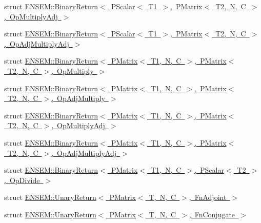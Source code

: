 \begin{DoxyCompactItemize}
\item 
struct \mbox{\hyperlink{structENSEM_1_1BinaryReturn_3_01PScalar_3_01T1_01_4_00_01PMatrix_3_01T2_00_01N_00_01C_01_4_00_01OpMultiplyAdj_01_4}{E\+N\+S\+E\+M\+::\+Binary\+Return$<$ P\+Scalar$<$ T1 $>$, P\+Matrix$<$ T2, N, C $>$, Op\+Multiply\+Adj $>$}}
\item 
struct \mbox{\hyperlink{structENSEM_1_1BinaryReturn_3_01PScalar_3_01T1_01_4_00_01PMatrix_3_01T2_00_01N_00_01C_01_4_00_01OpAdjMultiplyAdj_01_4}{E\+N\+S\+E\+M\+::\+Binary\+Return$<$ P\+Scalar$<$ T1 $>$, P\+Matrix$<$ T2, N, C $>$, Op\+Adj\+Multiply\+Adj $>$}}
\item 
struct \mbox{\hyperlink{structENSEM_1_1BinaryReturn_3_01PMatrix_3_01T1_00_01N_00_01C_01_4_00_01PMatrix_3_01T2_00_01N_00_01C_01_4_00_01OpMultiply_01_4}{E\+N\+S\+E\+M\+::\+Binary\+Return$<$ P\+Matrix$<$ T1, N, C $>$, P\+Matrix$<$ T2, N, C $>$, Op\+Multiply $>$}}
\item 
struct \mbox{\hyperlink{structENSEM_1_1BinaryReturn_3_01PMatrix_3_01T1_00_01N_00_01C_01_4_00_01PMatrix_3_01T2_00_01N_00_0c796edb815901ee07e52957841490ec}{E\+N\+S\+E\+M\+::\+Binary\+Return$<$ P\+Matrix$<$ T1, N, C $>$, P\+Matrix$<$ T2, N, C $>$, Op\+Adj\+Multiply $>$}}
\item 
struct \mbox{\hyperlink{structENSEM_1_1BinaryReturn_3_01PMatrix_3_01T1_00_01N_00_01C_01_4_00_01PMatrix_3_01T2_00_01N_00_d45cd1d9e02779a140d03751534bd050}{E\+N\+S\+E\+M\+::\+Binary\+Return$<$ P\+Matrix$<$ T1, N, C $>$, P\+Matrix$<$ T2, N, C $>$, Op\+Multiply\+Adj $>$}}
\item 
struct \mbox{\hyperlink{structENSEM_1_1BinaryReturn_3_01PMatrix_3_01T1_00_01N_00_01C_01_4_00_01PMatrix_3_01T2_00_01N_00_79410733ba13e6def1042c111bee3e0e}{E\+N\+S\+E\+M\+::\+Binary\+Return$<$ P\+Matrix$<$ T1, N, C $>$, P\+Matrix$<$ T2, N, C $>$, Op\+Adj\+Multiply\+Adj $>$}}
\item 
struct \mbox{\hyperlink{structENSEM_1_1BinaryReturn_3_01PMatrix_3_01T1_00_01N_00_01C_01_4_00_01PScalar_3_01T2_01_4_00_01OpDivide_01_4}{E\+N\+S\+E\+M\+::\+Binary\+Return$<$ P\+Matrix$<$ T1, N, C $>$, P\+Scalar$<$ T2 $>$, Op\+Divide $>$}}
\item 
struct \mbox{\hyperlink{structENSEM_1_1UnaryReturn_3_01PMatrix_3_01T_00_01N_00_01C_01_4_00_01FnAdjoint_01_4}{E\+N\+S\+E\+M\+::\+Unary\+Return$<$ P\+Matrix$<$ T, N, C $>$, Fn\+Adjoint $>$}}
\item 
struct \mbox{\hyperlink{structENSEM_1_1UnaryReturn_3_01PMatrix_3_01T_00_01N_00_01C_01_4_00_01FnConjugate_01_4}{E\+N\+S\+E\+M\+::\+Unary\+Return$<$ P\+Matrix$<$ T, N, C $>$, Fn\+Conjugate $>$}}

\end{DoxyCompactItemize}
